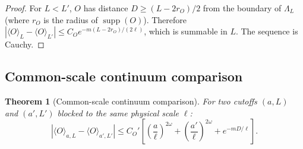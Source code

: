 \documentclass[12pt]{article}
\theoremstyle{plain}
\newtheorem{theorem}{Theorem}[section]
\theoremstyle{definition}
\numberwithin{equation}{section}
\newcommand{\supp}{\operatorname{supp}}
\begin{document}
\begin{proof}
For $L<L'$, $O$ has distance $D\geq(L-2r_O)/2$ from the boundary of $\Lambda_L$ (where $r_O$ is the radius of $\supp(O)$).  Therefore $|\langle O\rangle_L-\langle O\rangle_{L'}|\leq C_O e^{-m(L-2r_O)/(2\ell)}$, which is summable in $L$.  The sequence is Cauchy.
\end{proof}

\subsection{Common-scale continuum comparison}

\begin{theorem}[Common-scale continuum comparison]\label{thm:commonscale}
For two cutoffs $(a,L)$ and $(a',L')$ blocked to the same physical scale $\ell$:
\begin{equation}
\left|\langle O\rangle_{a,L}-\langle O\rangle_{a',L'}\right|
\leq C_O'\left[\left(\frac{a}{\ell}\right)^{2\omega}+\left(\frac{a'}{\ell}\right)^{2\omega}+e^{-mD/\ell}\right].
\end{equation}
\end{theorem}
\end{document}
